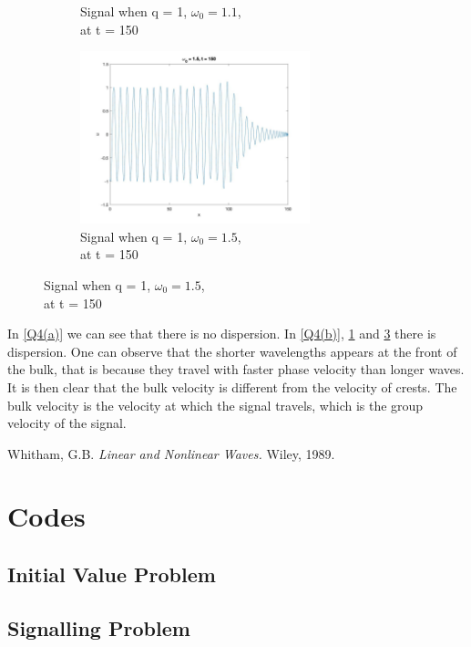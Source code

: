 \documentclass[a4paper,11pt]{article}
\begin{document}
\begin{figure}[H]
\begin{subfigure}{0.5\textwidth}
 \caption{Signal when q = 1, $\omega_0 = 1.1$, \\at t = 150}
 \label{Q4(c)}
 \end{subfigure}
 \begin{subfigure}{0.5\textwidth}
 \includegraphics[width = \linewidth, height =5cm]{Q4(3).jpg}
 \caption{Signal when q = 1, $\omega_0 = 1.5$, \\at t = 150}
 \label{Q4(d)}
 \end{subfigure}
\end{figure}
In \ref{Q4(a)} we can see that there is no dispersion. In \ref{Q4(b)}, \ref{Q4(c)} and \ref{Q4(d)} there is dispersion. One can observe that the shorter wavelengths appears at the front of the bulk, that is because they travel with faster phase velocity than longer waves. It is then clear that the bulk velocity is different from the velocity of crests. The bulk velocity is the velocity at which the signal travels, which is the group velocity of the signal.

\begin{thebibliography}{9}
Whitham, G.B.
\textit{Linear and Nonlinear Waves.} 
Wiley, 1989.
\end{thebibliography}
\appendix
\section{Codes}
\subsection{Initial Value Problem}
\label{P1}

\newpage
\subsection{Signalling Problem}
\label{P2}

\end{document}
